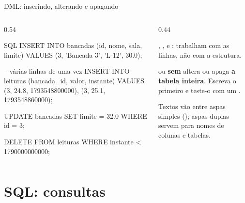 \documentclass[aspectratio=169,10pt]{beamer}
\begin{document}
\begin{frame}[fragile]{DML: inserindo, alterando e apagando}
  \begin{columns}[T]
    \begin{column}{0.54\textwidth}
\begin{codigo}[title=Manipulando dados]{SQL}
INSERT INTO bancadas (id, nome, sala, limite)
VALUES (3, 'Bancada 3', 'L-12', 30.0);

-- várias linhas de uma vez
INSERT INTO leituras (bancada_id, valor, instante)
VALUES (3, 24.8, 1793548800000),
       (3, 25.1, 1793548860000);

UPDATE bancadas
SET    limite = 32.0
WHERE  id = 3;

DELETE FROM leituras
WHERE  instante < 1790000000000;
\end{codigo}
    \end{column}
    \begin{column}{0.44\textwidth}
      \begin{conceito}
        , ,  e : trabalham com as linhas, não com a estrutura.
      \end{conceito}
      \begin{erro}
         ou  \textbf{sem}  altera ou apaga \textbf{a tabela inteira}. Escreva o  primeiro e teste-o com um .
      \end{erro}
      \begin{dica}
        Textos vão entre aspas simples (); aspas duplas servem para nomes de colunas e tabelas.
      \end{dica}
    \end{column}
  \end{columns}
\end{frame}

\section{SQL: consultas}
\end{document}
